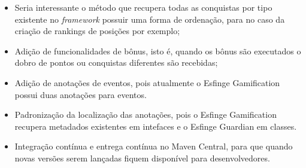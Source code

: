 \begin{itemize}
    \item Seria interessante o método que recupera todas as conquistas por tipo existente no \textit{framework} possuir uma forma de ordenação, para no caso da criação de rankings de posições por exemplo;
    \item Adição de funcionalidades de bônus, isto é, quando os bônus são executados o dobro de pontos ou conquistas diferentes são recebidas;
    \item Adição de anotações de eventos, pois atualmente o Esfinge Gamification possui duas anotações para eventos.
    \item Padronização da localização das anotações, pois o Esfinge Gamification recupera metadados existentes em intefaces e o Esfinge Guardian em classes.
    \item Integração contínua e entrega contínua no Maven Central, para que quando novas versões serem lançadas fiquem disponível para desenvolvedores.
    
\end{itemize}